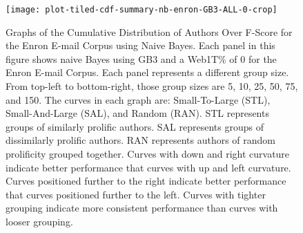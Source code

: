 	
	\begin{figure}[htbp!]
		\begin{center}
		\centering
		\texttt{[image: plot-tiled-cdf-summary-nb-enron-GB3-ALL-0-crop]}
		\caption{Graphs of the Cumulative Distribution of Authors Over F-Score for the Enron E-mail Corpus using Naive Bayes. Each panel in this figure shows naive Bayes using GB3 and a Web1T\% of 0 for the Enron E-mail Corpus.  Each panel represents a different group size.  From top-left to bottom-right, those group sizes are 5, 10, 25, 50, 75, and 150. The curves in each graph are: Small-To-Large (STL), Small-And-Large (SAL), and Random (RAN).  STL represents groups of similarly prolific authors.  SAL represents groups of dissimilarly prolific authors.  RAN represents authors of random prolificity grouped together.  Curves with down and right curvature indicate better performance that curves with up and left curvature.  Curves positioned further to the right indicate better performance that curves positioned further to the left.  Curves with tighter grouping indicate more consistent performance than curves with looser grouping.}
		\label{fig:plot-tiled-cdf-summary-nb-enron-GB3-ALL-0}
		\end{center}
	\end{figure}
